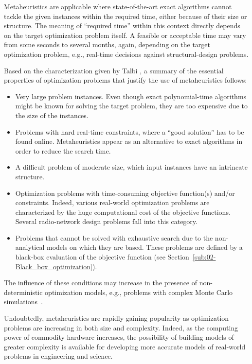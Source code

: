 Metaheuristics are applicable where state-of-the-art exact algorithms
cannot tackle the given instances within the required time, either
because of their size or structure. The meaning of ``required time''
within this context directly depends on the target optimization problem
itself. A feasible or acceptable time may vary from some seconds to
several months, again, depending on the target optimization problem,
e.g., real-time decisions against structural-design problems.

Based on the characterization given by Talbi \cite{Talbi-Metaheuristics_from_design_to_implementation:2009},
a summary of the essential properties of optimization problems that
justify the use of metaheuristics follows:
\begin{itemize}
\item Very large problem instances. Even though exact polynomial-time algorithms
might be known for solving the target problem, they are too expensive
due to the size of the instances.
\item Problems with hard real-time constraints, where a ``good solution''
has to be found online. Metaheuristics appear as an alternative to
exact algorithms in order to reduce the search time.
\item A difficult problem of moderate size, which input instances have an
intrincate structure.
\item Optimization problems with time-consuming objective function(s) and/or
constraints. Indeed, various real-world optimization problems are
characterized by the huge computational cost of the objective functions.
Several radio-network design problems fall into this category.
\item Problems that cannot be solved with exhaustive search due to the non-analytical
models on which they are based. These problems are defined by a black-box
evaluation of the objective function (see Section~\ref{sub:02-Black_box_optimization}).
\end{itemize}
The influence of these conditions may increase in the presence of
non-deterministic optimization models, e.g., problems with complex
Monte Carlo simulations~\cite{Creutz-Microcanonincal_monte_carlo_simulation:1983}.

Undoubtedly, metaheuristics are rapidly gaining popularity as optimization
problems are increasing in both size and complexity. Indeed, as the
computing power of commodity hardware increases, the possibility of
building models of greater complexity is available for developing
more accurate models of real-world problems in engineering and science.


